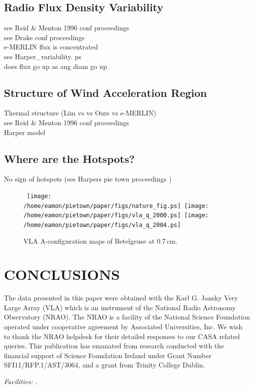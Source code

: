\documentclass[iop]{emulateapj}
\begin{document}
\subsection{Radio Flux Density Variability} 
see Reid \& Menton 1996 conf proceedings\\
see Drake conf proceedings\\
e-MERLIN flux is concentrated\\
see Harper\_variability. ps\\
does flux go up as ang diam go up

\subsection{Structure of Wind Acceleration Region} 
Thermal structure (Lim vs vs Ours vs e-MERLIN)\\
see Reid \& Menton 1996 conf proceedings\\
Harper model

\subsection{Where are the Hotspots?}

No sign of hotspots (see Harpers pie town proceedings )




\begin{figure*}
\mbox{
\texttt{[image: /home/eamon/pietown/paper/figs/nature\_fig.ps]}
\texttt{[image: /home/eamon/pietown/paper/figs/vla\_q\_2000.ps]}
\texttt{[image: /home/eamon/pietown/paper/figs/vla\_q\_2004.ps]}
}
\caption{VLA A-configuration maps of Betelgeuse at 0.7\,cm. }
\label{fig:fig5}
\end{figure*}




\section{CONCLUSIONS}
 


\acknowledgments
The data presented in this paper were obtained with the Karl G. Jansky Very Large Array (VLA) which is an instrument of the National Radio Astronomy Observatory (NRAO). The NRAO is a facility of the National Science Foundation operated under cooperative agreement by Associated Universities, Inc. We wish to thank the NRAO helpdesk for their detailed responses to our CASA related queries. This publication has emanated from research conducted with the financial support of Science Foundation Ireland under Grant Number SFI11/RFP.1/AST/3064, and a grant from Trinity College Dublin.

{\it Facilities:} .




\end{document}
